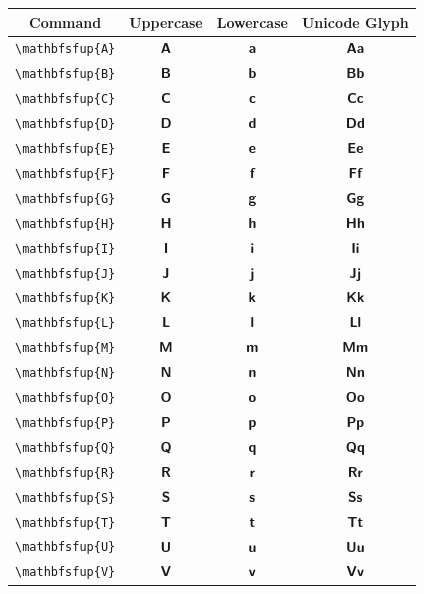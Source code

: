 \documentclass[12pt,a4paper]{article}
\begin{document}
\begin{longtable}{|c|c|c|c|}
\hline
\textbf{Command} & \textbf{Uppercase} & \textbf{Lowercase} & \textbf{Unicode Glyph} \\
\hline
\verb|\mathbfsfup{A}| & $\mathbfsfup{A}$ & $\mathbfsfup{a}$ & $ 𝗔 𝗮 $ \\
\verb|\mathbfsfup{B}| & $\mathbfsfup{B}$ & $\mathbfsfup{b}$ & $ 𝗕 𝗯 $ \\
\verb|\mathbfsfup{C}| & $\mathbfsfup{C}$ & $\mathbfsfup{c}$ & $ 𝗖 𝗰 $ \\
\verb|\mathbfsfup{D}| & $\mathbfsfup{D}$ & $\mathbfsfup{d}$ & $ 𝗗 𝗱 $ \\
\verb|\mathbfsfup{E}| & $\mathbfsfup{E}$ & $\mathbfsfup{e}$ & $ 𝗘 𝗲 $ \\
\verb|\mathbfsfup{F}| & $\mathbfsfup{F}$ & $\mathbfsfup{f}$ & $ 𝗙 𝗳 $ \\
\verb|\mathbfsfup{G}| & $\mathbfsfup{G}$ & $\mathbfsfup{g}$ & $ 𝗚 𝗴 $ \\
\verb|\mathbfsfup{H}| & $\mathbfsfup{H}$ & $\mathbfsfup{h}$ & $ 𝗛 𝗵 $ \\
\verb|\mathbfsfup{I}| & $\mathbfsfup{I}$ & $\mathbfsfup{i}$ & $ 𝗜 𝗶 $ \\
\verb|\mathbfsfup{J}| & $\mathbfsfup{J}$ & $\mathbfsfup{j}$ & $ 𝗝 𝗷 $ \\
\verb|\mathbfsfup{K}| & $\mathbfsfup{K}$ & $\mathbfsfup{k}$ & $ 𝗞 𝗸 $ \\
\verb|\mathbfsfup{L}| & $\mathbfsfup{L}$ & $\mathbfsfup{l}$ & $ 𝗟 𝗹 $ \\
\verb|\mathbfsfup{M}| & $\mathbfsfup{M}$ & $\mathbfsfup{m}$ & $ 𝗠 𝗺 $ \\
\verb|\mathbfsfup{N}| & $\mathbfsfup{N}$ & $\mathbfsfup{n}$ & $ 𝗡 𝗻 $ \\
\verb|\mathbfsfup{O}| & $\mathbfsfup{O}$ & $\mathbfsfup{o}$ & $ 𝗢 𝗼 $ \\
\verb|\mathbfsfup{P}| & $\mathbfsfup{P}$ & $\mathbfsfup{p}$ & $ 𝗣 𝗽 $ \\
\verb|\mathbfsfup{Q}| & $\mathbfsfup{Q}$ & $\mathbfsfup{q}$ & $ 𝗤 𝗾 $ \\
\verb|\mathbfsfup{R}| & $\mathbfsfup{R}$ & $\mathbfsfup{r}$ & $ 𝗥 𝗿 $ \\
\verb|\mathbfsfup{S}| & $\mathbfsfup{S}$ & $\mathbfsfup{s}$ & $ 𝗦 𝘀 $ \\
\verb|\mathbfsfup{T}| & $\mathbfsfup{T}$ & $\mathbfsfup{t}$ & $ 𝗧 𝘁 $ \\
\verb|\mathbfsfup{U}| & $\mathbfsfup{U}$ & $\mathbfsfup{u}$ & $ 𝗨 𝘂 $ \\
\verb|\mathbfsfup{V}| & $\mathbfsfup{V}$ & $\mathbfsfup{v}$ & $ 𝗩 𝘃 $ \\

\end{longtable}
\end{document}
